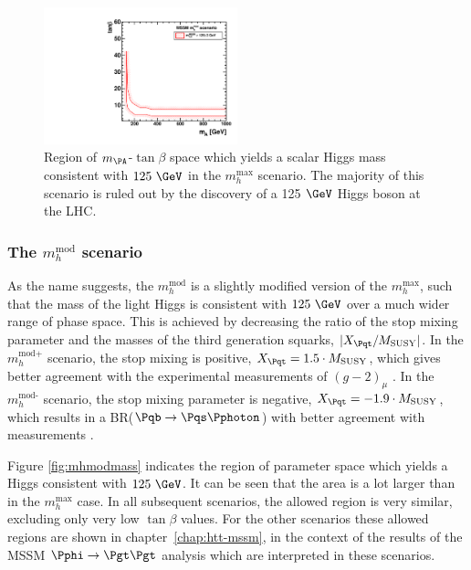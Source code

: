 \begin{figure}[htbp]
   \includegraphics[width=0.5\textwidth]{plots/theory/cmb_mhmax-HypoTest.pdf}
\caption[Region of $m_{\PA}$-$\tan\beta$ space which yields a scalar Higgs mass 
consistent with $125~\GeV$ in the $m_{h}^{\text{max}}$ scenario.]
{Region of $m_{\PA}$-$\tan\beta$ space which yields a scalar Higgs mass 
consistent with $125~\GeV$ in the $m_{h}^{\text{max}}$ scenario. The majority of
this scenario is ruled out by the discovery of a 125$~\GeV$ Higgs boson at the
LHC.}
\label{fig:mhmaxmass}
\end{figure}

\subsubsection{The $m_{h}^{\text{mod}}$ scenario}
\label{sec:mhmodscenario}

As the name suggests, the $m_{h}^{\text{mod}}$ is a slightly modified version of
the $m_{h}^{\text{max}}$, such that the mass of the light Higgs is consistent
with $125~\GeV$ over a much wider range of phase space. This is achieved by
decreasing the ratio of the stop mixing parameter and the masses of the third
generation squarks, $|X_{\Pqt}/M_{\text{SUSY}}|$. In the $m_{h}^{\text{mod+}}$
scenario, the stop mixing is positive, $X_{\Pqt} = 1.5 \cdot M_{\text{SUSY}}$,
which gives better agreement with the experimental measurements of $(g-2)_{\mu}$
\cite{Miller:2007kk}. In the $m_{h}^{\text{mod-}}$ scenario, the stop mixing parameter is
negative, $X_{\Pqt} = -1.9 \cdot M_{\text{SUSY}}$, which results in a
BR($\Pqb\to\Pqs\Pphoton$) with better agreement with measurements
\cite{Lees:2012wg}.

Figure \ref{fig:mhmodmass} indicates the region of parameter space which yields
a Higgs consistent with $125~\GeV$. It can be seen that the area is a lot larger
than in the $m_{h}^{\text{max}}$ case. In all subsequent scenarios, the allowed
region is very similar, excluding only very low $\tan\beta$ values. For the
other scenarios these allowed regions are shown in chapter~\ref{chap:htt-mssm},
in the context of the results of the MSSM $\Pphi \to \Pgt\Pgt$ analysis which
are interpreted in these scenarios.

